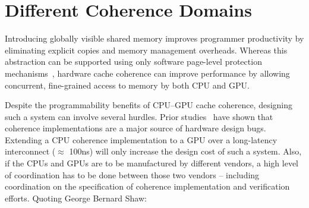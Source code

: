\section{Different Coherence Domains}
Introducing globally visible shared memory improves programmer productivity by
eliminating explicit copies and memory management overheads. Whereas this
abstraction can be supported using only software page-level protection
mechanisms~\cite{UVM, HSA}, hardware cache coherence can improve performance by
allowing concurrent, fine-grained access to memory by both CPU and GPU.


Despite the programmability benefits of CPU--GPU cache coherence, designing such
a system can involve several hurdles. Prior
studies~\cite{Hong2012,Vantrease:2011:ACL:2014698.2014902} have shown
that coherence implementations are a major source of hardware design bugs.
Extending a CPU coherence implementation to a GPU over a long-latency
interconnect ($\approx$ 100ns)  will only increase the design cost of such a
system.  Also, if the CPUs and GPUs are to be manufactured by different vendors,
a high level of coordination has to be done between those two vendors --
including coordination on the specification of coherence implementation and
verification efforts. Quoting George Bernard Shaw:

